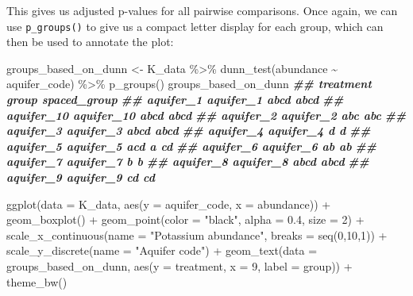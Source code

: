 \documentclass[
]{krantz}
\newenvironment{Shaded}{\begin{snugshade}}{\end{snugshade}}
\newcommand{\AttributeTok}[1]{\textcolor[rgb]{0.77,0.63,0.00}{#1}}
\newcommand{\DecValTok}[1]{\textcolor[rgb]{0.00,0.00,0.81}{#1}}
\newcommand{\DocumentationTok}[1]{\textcolor[rgb]{0.56,0.35,0.01}{\textbf{\textit{#1}}}}
\newcommand{\FloatTok}[1]{\textcolor[rgb]{0.00,0.00,0.81}{#1}}
\newcommand{\FunctionTok}[1]{\textcolor[rgb]{0.00,0.00,0.00}{#1}}
\newcommand{\NormalTok}[1]{#1}
\newcommand{\OtherTok}[1]{\textcolor[rgb]{0.56,0.35,0.01}{#1}}
\newcommand{\SpecialCharTok}[1]{\textcolor[rgb]{0.00,0.00,0.00}{#1}}
\newcommand{\StringTok}[1]{\textcolor[rgb]{0.31,0.60,0.02}{#1}}
\begin{document}
This gives us adjusted p-values for all pairwise comparisons. Once again, we can use \texttt{p\_groups()} to give us a compact letter display for each group, which can then be used to annotate the plot:

\begin{Shaded}
\begin{Highlighting}[]
\NormalTok{groups\_based\_on\_dunn }\OtherTok{\textless{}{-}}\NormalTok{ K\_data }\SpecialCharTok{\%\textgreater{}\%}
  \FunctionTok{dunn\_test}\NormalTok{(abundance }\SpecialCharTok{\textasciitilde{}}\NormalTok{ aquifer\_code) }\SpecialCharTok{\%\textgreater{}\%}
  \FunctionTok{p\_groups}\NormalTok{()}
\NormalTok{groups\_based\_on\_dunn}
\DocumentationTok{\#\#             treatment group spaced\_group}
\DocumentationTok{\#\# aquifer\_1   aquifer\_1  abcd         abcd}
\DocumentationTok{\#\# aquifer\_10 aquifer\_10  abcd         abcd}
\DocumentationTok{\#\# aquifer\_2   aquifer\_2   abc         abc }
\DocumentationTok{\#\# aquifer\_3   aquifer\_3  abcd         abcd}
\DocumentationTok{\#\# aquifer\_4   aquifer\_4     d            d}
\DocumentationTok{\#\# aquifer\_5   aquifer\_5   acd         a cd}
\DocumentationTok{\#\# aquifer\_6   aquifer\_6    ab         ab  }
\DocumentationTok{\#\# aquifer\_7   aquifer\_7     b          b  }
\DocumentationTok{\#\# aquifer\_8   aquifer\_8  abcd         abcd}
\DocumentationTok{\#\# aquifer\_9   aquifer\_9    cd           cd}

\FunctionTok{ggplot}\NormalTok{(}\AttributeTok{data =}\NormalTok{ K\_data, }\FunctionTok{aes}\NormalTok{(}\AttributeTok{y =}\NormalTok{ aquifer\_code, }\AttributeTok{x =}\NormalTok{ abundance)) }\SpecialCharTok{+}
  \FunctionTok{geom\_boxplot}\NormalTok{() }\SpecialCharTok{+}
  \FunctionTok{geom\_point}\NormalTok{(}\AttributeTok{color =} \StringTok{"black"}\NormalTok{, }\AttributeTok{alpha =} \FloatTok{0.4}\NormalTok{, }\AttributeTok{size =} \DecValTok{2}\NormalTok{) }\SpecialCharTok{+}
  \FunctionTok{scale\_x\_continuous}\NormalTok{(}\AttributeTok{name =} \StringTok{"Potassium abundance"}\NormalTok{, }\AttributeTok{breaks =} \FunctionTok{seq}\NormalTok{(}\DecValTok{0}\NormalTok{,}\DecValTok{10}\NormalTok{,}\DecValTok{1}\NormalTok{)) }\SpecialCharTok{+}
  \FunctionTok{scale\_y\_discrete}\NormalTok{(}\AttributeTok{name =} \StringTok{"Aquifer code"}\NormalTok{) }\SpecialCharTok{+}
  \FunctionTok{geom\_text}\NormalTok{(}\AttributeTok{data =}\NormalTok{ groups\_based\_on\_dunn, }\FunctionTok{aes}\NormalTok{(}\AttributeTok{y =}\NormalTok{ treatment, }\AttributeTok{x =} \DecValTok{9}\NormalTok{, }\AttributeTok{label =}\NormalTok{ group)) }\SpecialCharTok{+}
  \FunctionTok{theme\_bw}\NormalTok{()}
\end{Highlighting}
\end{Shaded}
\end{document}
